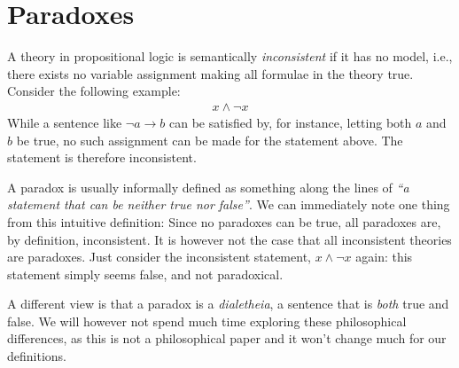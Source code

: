\section{Paradoxes}
\label{sec:Paradoxes}
A theory in propositional logic is semantically \textit{inconsistent} if it has no model, i.e., there exists no variable assignment making all formulae in the theory true.
Consider the following example:
\begin{align}
  x \wedge \neg x
\end{align}
While a sentence like $\neg a \rightarrow b$ can be satisfied by, for instance, letting both $a$ and $b$ be true, no such assignment can be made for the statement above.
The statement is therefore inconsistent.

A paradox is usually informally defined as something along the lines of \textit{``a statement that can be neither true nor false''}.
We can immediately note one thing from this intuitive definition:
Since no paradoxes can be true, all paradoxes are, by definition, inconsistent.
It is however not the case that all inconsistent theories are paradoxes.
Just consider the inconsistent statement, $x \wedge \neg x$ again: this statement simply seems false, and not paradoxical.

A different view is that a paradox is a \textit{dialetheia}, a sentence that is \textit{both} true and false\cite{sep-dialetheism}. We will however not spend much time exploring these philosophical differences, as this is not a philosophical paper and it won't change much for our definitions.

